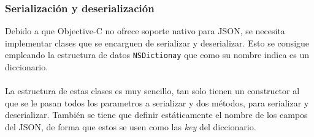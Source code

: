 \documentclass[a4paper, 12pt]{article}
\begin{document}
\subsubsection{Serialización y deserialización}
\label{sec-4-2-2}
Debido a que Objective-C no ofrece soporte nativo para JSON, se necesita implementar clases que se encarguen de serializar y deserializar. Esto se consigue empleando la estructura de datos \verb~NSDictionay~
que como su nombre indica es un diccionario.
\\
\\
La estructura de estas clases es muy sencillo, tan solo tienen un constructor al que se le pasan todos los parametros a serializar y dos métodos, para serializar y deserializar. También se tiene que definir
estáticamente el nombre de los campos del JSON, de forma que estos se usen como las \emph{key} del diccionario.
\end{document}
